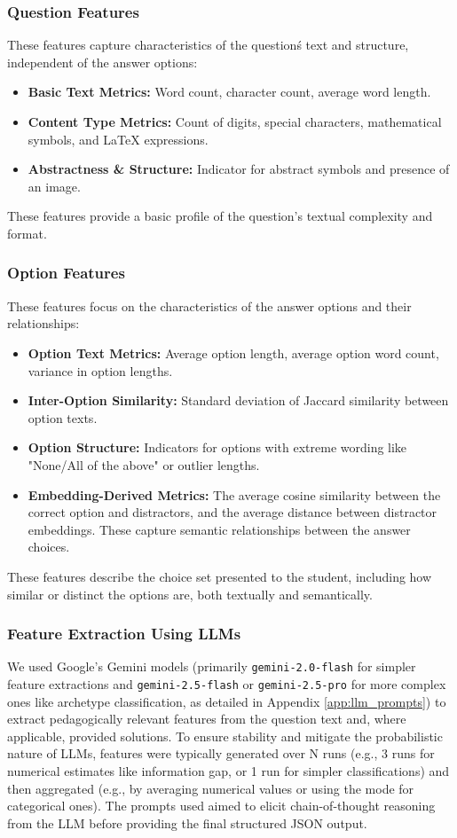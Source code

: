 \documentclass[
    a4paper, %
    10pt, %
    twoside, %
]{LTJournalArticle}
\begin{document}
\subsubsection{Question Features}
These features capture characteristics of the question\'s text and structure, independent of the answer options:
\begin{itemize}
    \item \textbf{Basic Text Metrics:} Word count, character count, average word length.
    \item \textbf{Content Type Metrics:} Count of digits, special characters, mathematical symbols, and LaTeX expressions.
    \item \textbf{Abstractness \& Structure:} Indicator for abstract symbols and presence of an image.
\end{itemize}
These features provide a basic profile of the question's textual complexity and format.

\subsubsection{Option Features}
These features focus on the characteristics of the answer options and their relationships:
\begin{itemize}
    \item \textbf{Option Text Metrics:} Average option length, average option word count, variance in option lengths.
    \item \textbf{Inter-Option Similarity:} Standard deviation of Jaccard similarity between option texts.
    \item \textbf{Option Structure:} Indicators for options with extreme wording like "None/All of the above" or outlier lengths.
    \item \textbf{Embedding-Derived Metrics:} The average cosine similarity between the correct option and distractors, and the average distance between distractor embeddings. These capture semantic relationships between the answer choices.
\end{itemize}
These features describe the choice set presented to the student, including how similar or distinct the options are, both textually and semantically.

\subsubsection{Feature Extraction Using LLMs}
We used Google's Gemini models (primarily \texttt{gemini-2.0-flash} for simpler feature extractions and \texttt{gemini-2.5-flash} or \texttt{gemini-2.5-pro} for more complex ones like archetype classification, as detailed in Appendix \ref{app:llm_prompts}) to extract pedagogically relevant features from the question text and, where applicable, provided solutions. To ensure stability and mitigate the probabilistic nature of LLMs, features were typically generated over N runs (e.g., 3 runs for numerical estimates like information gap, or 1 run for simpler classifications) and then aggregated (e.g., by averaging numerical values or using the mode for categorical ones). The prompts used aimed to elicit chain-of-thought reasoning from the LLM before providing the final structured JSON output.
\end{document}
